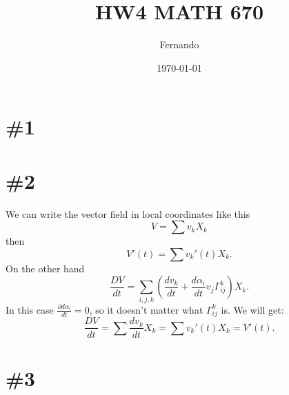 \documentclass{article}
\begin{document}
\newcommand{\R}{\mathbb{R}}

\title{HW4 MATH 670}
\author{Fernando}
\date{\today}
\maketitle

\section*{\#1}
\section*{\#2}
We can write the vector field in local coordinates like this
\[
  V=\sum v_kX_k
\]
then
\[
  V'(t)=\sum v_k'(t)X_k.
\]
On the other hand
\[
  \frac{DV}{dt}=\sum_{i,j,k}\left(\frac{dv_k}{dt}+\frac{d\alpha_i}{dt}v_j\Gamma^k_{ij}\right)X_k.
\]
In this case \(\frac{\partial d\alpha_i}{dt}=0\), so it doesn't matter what \(\Gamma^k_{ij}\) is. We will get:
\[
  \frac{DV}{dt}=\sum\frac{dv_k}{dt}X_k=\sum v_k'(t)X_k=V'(t).
\]
\section*{\#3}
\end{document}
